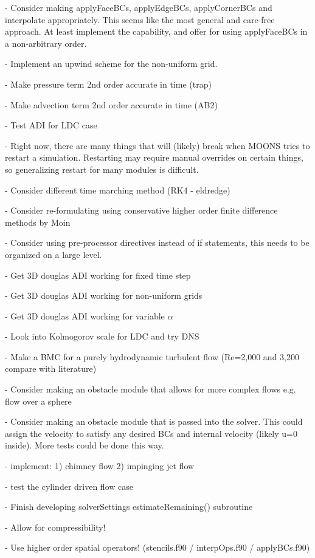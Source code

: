 \documentclass[11pt]{article}
\begin{document}
- Consider making applyFaceBCs, applyEdgeBCs, applyCornerBCs and interpolate appropriately. This seems like the most general and care-free approach. At least implement the capability, and offer for using applyFaceBCs in a non-arbitrary order.

- Implement an upwind scheme for the non-uniform grid.

- Make pressure term 2nd order accurate in time (trap)

- Make advection term 2nd order accurate in time (AB2)

- Test ADI for LDC case

- Right now, there are many things that will (likely) break when MOONS tries to restart a simulation. Restarting may require manual overrides on certain things, so generalizing restart for many modules is difficult.

- Consider different time marching method (RK4 - eldredge)

- Consider re-formulating using conservative higher order finite difference methods by Moin

- Consider using pre-processor directives instead of if statements, this needs to be organized on a large level.

- Get 3D douglas ADI working for fixed time step

- Get 3D douglas ADI working for non-uniform grids

- Get 3D douglas ADI working for variable $\alpha$

- Look into Kolmogorov scale for LDC and try DNS

- Make a BMC for a purely hydrodynamic turbulent flow (Re=2,000 and 3,200 compare with literature)

- Consider making an obstacle module that allows for more complex flows
e.g. flow over a sphere

- Consider making an obstacle module that is passed into the solver.
This could assign the velocity to satisfy any desired BCs and internal
velocity (likely u=0 inside). More tests could be done this way.

- implement: 1) chimney flow 2) impinging jet flow

- test the cylinder driven flow case

- Finish developing solverSettings estimateRemaining() subroutine

- Allow for compressibility!

- Use higher order spatial operators! (stencils.f90 / interpOps.f90 / applyBCs.f90)
\end{document}
